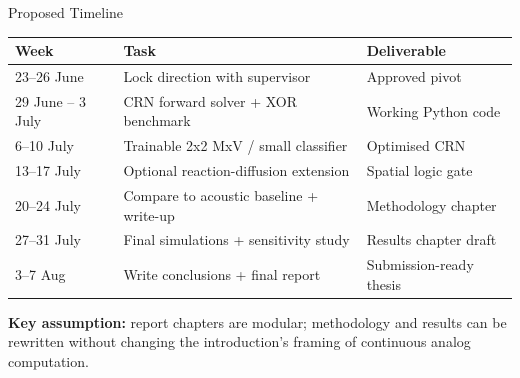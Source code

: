 \documentclass[aspectratio=169,11pt]{beamer}
\begin{document}
\begin{frame}{Proposed Timeline}
  \small
  \begin{center}
    \footnotesize
    \begin{tabular}{lll}
      \toprule
      Week & Task & Deliverable \\
      \midrule
      23--26 June & Lock direction with supervisor & Approved pivot \\
      29 June -- 3 July & CRN forward solver + XOR benchmark & Working Python code \\
      6--10 July & Trainable 2x2 MxV / small classifier & Optimised CRN \\
      13--17 July & Optional reaction-diffusion extension & Spatial logic gate \\
      20--24 July & Compare to acoustic baseline + write-up & Methodology chapter \\
      27--31 July & Final simulations + sensitivity study & Results chapter draft \\
      3--7 Aug & Write conclusions + final report & Submission-ready thesis \\
      \bottomrule
    \end{tabular}
  \end{center}

  \vspace{0.15cm}
  \textbf{Key assumption:} report chapters are modular; methodology and results can be rewritten without changing the introduction's framing of continuous analog computation.
\end{frame}
\end{document}
